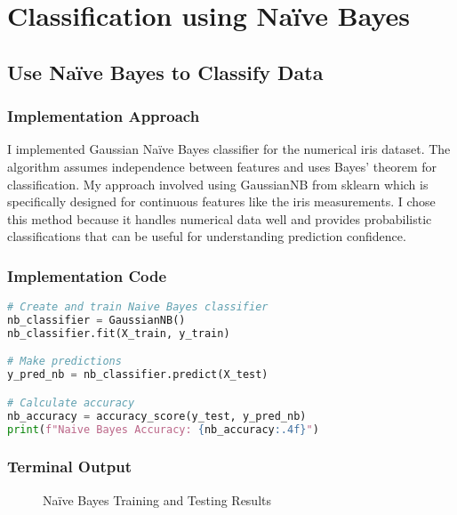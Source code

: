\documentclass[12pt,a4paper]{article}
\begin{document}
\section{Classification using Na\"{i}ve Bayes}

\subsection{Use Na\"{i}ve Bayes to Classify Data}

\subsubsection{Implementation Approach}
I implemented Gaussian Na\"{i}ve Bayes classifier for the numerical iris dataset. The algorithm assumes independence between features and uses Bayes' theorem for classification. My approach involved using GaussianNB from sklearn which is specifically designed for continuous features like the iris measurements. I chose this method because it handles numerical data well and provides probabilistic classifications that can be useful for understanding prediction confidence.

\subsubsection{Implementation Code}
\begin{lstlisting}[language=Python, caption=Use Naive Bayes to Classify Data]
# Create and train Naive Bayes classifier
nb_classifier = GaussianNB()
nb_classifier.fit(X_train, y_train)

# Make predictions
y_pred_nb = nb_classifier.predict(X_test)

# Calculate accuracy
nb_accuracy = accuracy_score(y_test, y_pred_nb)
print(f"Naive Bayes Accuracy: {nb_accuracy:.4f}")
\end{lstlisting}

\subsubsection{Terminal Output}

\begin{figure}[h!]
    \centering
    \caption{Na\"{i}ve Bayes Training and Testing Results}
\end{figure}
\end{document}
